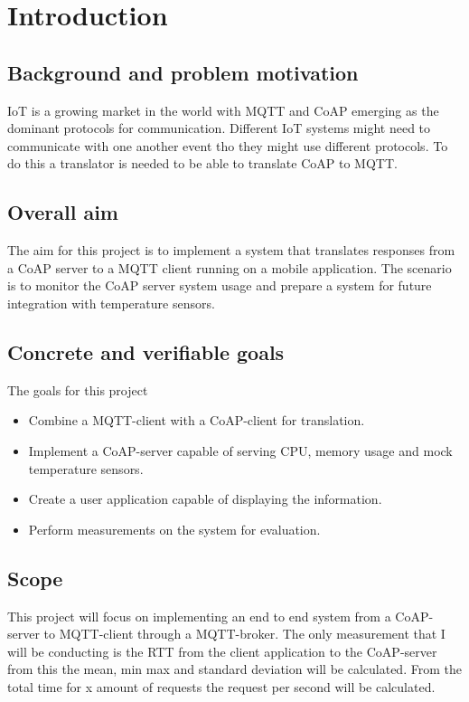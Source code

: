 \section{Introduction}
\label{ch:intro}
\noindent

\subsection{Background and problem motivation}
\label{ch:intro:problem-motivation}

IoT is a growing market in the world with MQTT and CoAP emerging as the dominant protocols for communication. Different IoT systems might need to communicate with one another event tho they might use different protocols. To do this a translator is needed to be able to translate CoAP to MQTT. 



\subsection{Overall aim}
\label{ch:intro:overall-aim}
The aim for this project is to implement a system that translates responses from a CoAP server to a MQTT client running on a mobile application. The scenario is to monitor the CoAP server system usage and prepare a system for future integration with temperature sensors. 


\subsection{Concrete and verifiable goals}
\label{ch:intro:verifiable-goals}
The goals for this project
\begin{itemize}
    \item Combine a MQTT-client with a CoAP-client for translation.
    \item Implement a CoAP-server capable of serving CPU, memory usage and mock temperature sensors.
    \item Create a user application capable of displaying the information.
    \item Perform measurements on the system for evaluation.
\end{itemize}

\subsection{Scope}
\label{ch:intro:scope}
This project will focus on implementing an end to end system from a CoAP-server to MQTT-client through a MQTT-broker. The only measurement that I will be conducting is the RTT from the client application to the CoAP-server from this the mean, min max and standard deviation will be calculated. From the total time for x amount of requests the request per second will be calculated.

